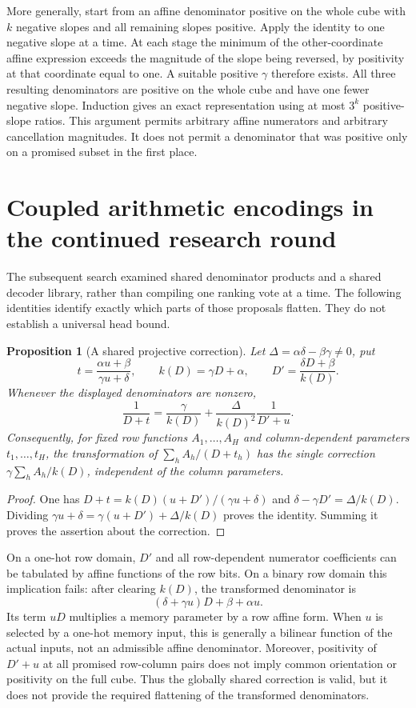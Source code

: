 \documentclass[11pt]{article}
\newtheorem{proposition}{Proposition}
\begin{document}
More generally, start from an affine denominator positive on the whole
cube with $k$ negative slopes and all remaining slopes positive.
Apply the identity to one negative slope at a time. At each stage
the minimum of the other-coordinate affine expression exceeds the
magnitude of the slope being reversed, by positivity at that
coordinate equal to one. A suitable positive $\gamma$ therefore exists.
All three resulting denominators are positive on the whole cube and
have one fewer negative slope. Induction gives an exact representation
using at most $3^k$ positive-slope ratios. This argument permits
arbitrary affine numerators and arbitrary cancellation magnitudes.
It does not permit a denominator that was positive only on a promised
subset in the first place.

\section{Coupled arithmetic encodings in the continued research round}

The subsequent search examined shared denominator products and a shared
decoder library, rather than compiling one ranking vote at a time. The
following identities identify exactly which parts of those proposals
flatten. They do not establish a universal head bound.

\begin{proposition}[A shared projective correction]
Let $\Delta=\alpha\delta-\beta\gamma\ne0$, put
\[
 t=\frac{\alpha u+\beta}{\gamma u+\delta},\qquad
 k(D)=\gamma D+\alpha,\qquad
 D'=\frac{\delta D+\beta}{k(D)}.
\]
Whenever the displayed denominators are nonzero,
\[
 \frac1{D+t}
 =\frac\gamma{k(D)}+
   \frac{\Delta}{k(D)^2}\frac1{D'+u}.
\]
Consequently, for fixed row functions $A_1,\ldots,A_H$ and
column-dependent parameters $t_1,\ldots,t_H$, the transformation of
$\sum_h A_h/(D+t_h)$ has the single correction
$\gamma\sum_h A_h/k(D)$, independent of the column parameters.
\end{proposition}
\begin{proof}
One has
$D+t=k(D)(u+D')/(\gamma u+\delta)$ and
$\delta-\gamma D'=\Delta/k(D)$. Dividing
$\gamma u+\delta=\gamma(u+D')+\Delta/k(D)$ proves the identity.
Summing it proves the assertion about the correction.
\end{proof}

On a one-hot row domain, $D'$ and all row-dependent numerator
coefficients can be tabulated by affine functions of the row bits.
On a binary row domain this implication fails: after clearing $k(D)$,
the transformed denominator is
\[
 (\delta+\gamma u)D+\beta+\alpha u.
\]
Its term $uD$ multiplies a memory parameter by a row affine form.
When $u$ is selected by a one-hot memory input, this is generally a
bilinear function of the actual inputs, not an admissible affine
denominator. Moreover, positivity of $D'+u$ at all promised row-column
pairs does not imply common orientation or positivity on the full cube.
Thus the globally shared correction is valid, but it does not provide
the required flattening of the transformed denominators.
\end{document}
